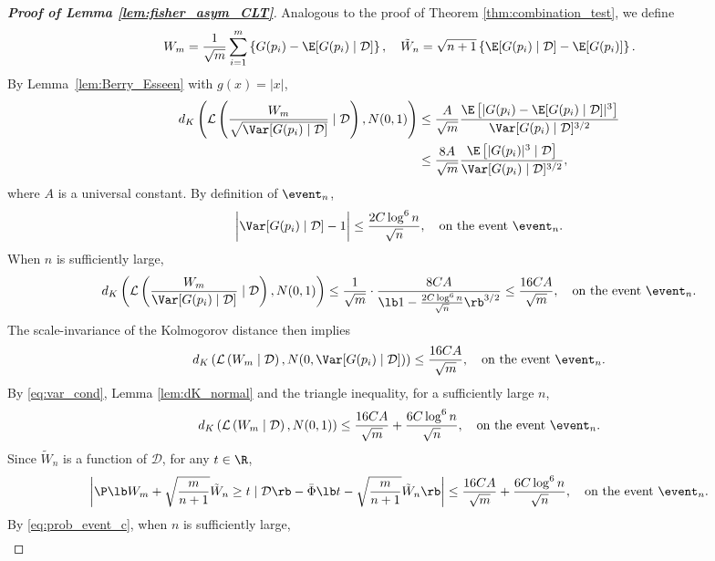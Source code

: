 \begin{proof}[\textbf{Proof of Lemma \ref{lem:fisher_asym_CLT}}]
Analogous to the proof of Theorem \ref{thm:combination_test}, we define
  \[W_{m} = \frac{1}{\sqrt{m}}\sum_{i=1}^{m}\left\{G(p_i) - \E[G(p_i)\mid \mathcal{D}]\right\}, \quad \tilde{W}_{n} = \sqrt{n + 1}\left\{\E[G(p_i)\mid \mathcal{D}] - \E[G(p_i)]\right\}.\]
  By Lemma~\ref{lem:Berry_Esseen} with $g(x) = |x|$,
  \begin{align*}
    d_{K}\left(\mathcal{L}\left(\frac{W_{m}}{\sqrt{\Var[G(p_i)\mid \mathcal{D}]}}\mid \mathcal{D}\right), N(0, 1)\right)&\le \frac{A}{\sqrt{m}}\frac{\E\left[|G(p_i) - \E[G(p_i)\mid \mathcal{D}]|^3\right]}{\Var[G(p_i)\mid \mathcal{D}]^{3/2}}\\
    & \le \frac{8A}{\sqrt{m}}\frac{\E\left[|G(p_i)|^3\mid \mathcal{D}\right]}{\Var[G(p_i)\mid \mathcal{D}]^{3/2}},
  \end{align*}
where $A$ is a universal constant. By definition of $\event_{n}$,
\begin{equation}
  \label{eq:var_cond}
  \bigg|\Var[G(p_i)\mid \mathcal{D}] - 1\bigg|\le \frac{2C\log^6 n}{\sqrt{n}}, \quad \text{on the event }\event_n.
\end{equation}
When $n$ is sufficiently large,
\begin{equation*}
  d_{K}\left(\mathcal{L}\left(\frac{W_{m}}{\Var[G(p_i)\mid \mathcal{D}]}\mid \mathcal{D}\right), N(0, 1)\right)\le \frac{1}{\sqrt{m}}\cdot\frac{8CA}{\lb 1 - \frac{2C\log^6 n}{\sqrt{n}}\rb^{3/2}}\le \frac{16CA}{\sqrt{m}}, \quad \text{on the event }\event_n.
\end{equation*}
The scale-invariance of the Kolmogorov distance then implies
\[d_{K}\left(\mathcal{L}\left(W_{m}\mid \mathcal{D}\right), N(0, \Var[G(p_i)\mid \mathcal{D}])\right)\le \frac{16CA}{\sqrt{m}}, \quad \text{on the event }\event_n.
\]
By \eqref{eq:var_cond}, Lemma \ref{lem:dK_normal} and the triangle inequality, for a sufficiently large $n$,
\begin{equation}
  \label{eq:dK_normal_Wm}
  d_{K}\left(\mathcal{L}\left(W_{m}\mid \mathcal{D}\right), N(0, 1)\right)\le \frac{16CA}{\sqrt{m}} + \frac{6C\log^6 n}{\sqrt{n}},\quad \text{on the event }\event_n.
\end{equation}
Since $\tilde{W}_{n}$ is a function of $\mathcal{D}$, for any $t\in \R$,
\[\bigg|\P\lb W_{m} + \sqrt{\frac{m}{n+1}}\tilde{W}_{n}\ge t \mid \mathcal{D}\rb - \bar{\Phi}\lb t - \sqrt{\frac{m}{n+1}}\tilde{W}_{n}\rb\bigg|\le \frac{16CA}{\sqrt{m}} + \frac{6C\log^6 n}{\sqrt{n}},\quad \text{on the event }\event_n.\]
By \eqref{eq:prob_event_c}, when $n$ is sufficiently large,
\begin{align}

\end{align}
\end{proof}

